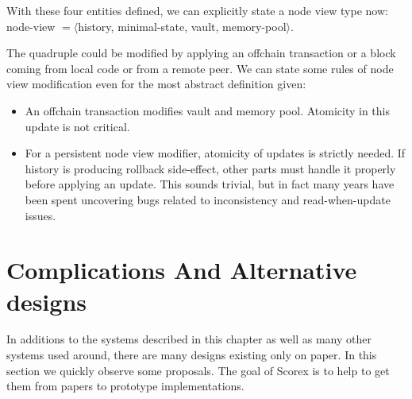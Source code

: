 \documentclass[]{report}   %
\begin{document}
With these four entities defined, we can explicitly state a node view type now: node-view $= \langle $history, minimal-state, vault, memory-pool$\rangle$.

The quadruple could be modified by applying an offchain transaction or a block coming from local code
or from a remote peer. We can state some rules of node view  modification even for the most abstract definition given:

\begin{itemize}
\item An offchain transaction modifies vault and memory pool. Atomicity in this update is not critical.

\item For a persistent node view modifier, atomicity of updates is strictly needed. If history is producing rollback side-effect, other parts must handle it properly before applying an update. This sounds trivial, but in fact many years have been spent uncovering bugs related to inconsistency and read-when-update issues.
\end{itemize}




%




\section{Complications And Alternative designs}
\label{alternatives}
In additions to the systems described in this chapter as well as many other systems used around, there are many designs existing only on paper. In this section we quickly observe some proposals. The goal of Scorex is to help to get them from papers to prototype implementations. 
\end{document}
